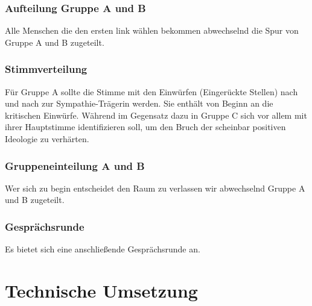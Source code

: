 \documentclass[a4paper, 12pt]{report}
\begin{document}
\subsection*{Aufteilung Gruppe A und B}
Alle Menschen die den ersten link wählen bekommen abwechselnd die Spur von Gruppe A und B zugeteilt.

\subsection*{Stimmverteilung}
Für Gruppe A sollte die Stimme mit den Einwürfen (Eingerückte Stellen) nach und nach zur Sympathie-Trägerin werden.
Sie enthält von Beginn an die kritischen Einwürfe. 
Während im Gegensatz dazu in Gruppe C sich vor allem mit ihrer Hauptstimme identifizieren soll, um den Bruch der scheinbar positiven Ideologie zu verhärten.

\subsection*{Gruppeneinteilung A und B}
Wer sich zu begin entscheidet den Raum zu verlassen wir abwechselnd Gruppe A und B zugeteilt.

\subsection*{Gesprächsrunde}
Es bietet sich eine anschließende Gesprächsrunde an.

\chapter*{Technische Umsetzung}\label{technische_umsetzung}

   
\printbibliography

\listoftodos
 
\end{document}
